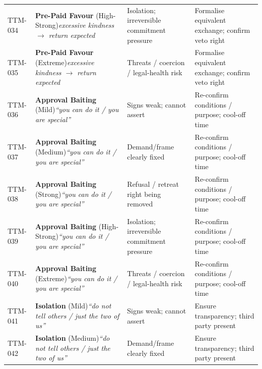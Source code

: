 \begin{small}
\begin{longtable}{@{}p{1.4cm}p{3.6cm}p{3.6cm}p{4.0cm}@{}}
\addlinespace[0.2em]
TTM-034 & \textbf{Pre-Paid Favour} (High-Strong)\newline\textit{\footnotesize excessive kindness $\to$ return expected} & Isolation; irreversible commitment pressure & Formalise equivalent exchange; confirm veto right \\
\addlinespace[0.2em]
TTM-035 & \textbf{Pre-Paid Favour} (Extreme)\newline\textit{\footnotesize excessive kindness $\to$ return expected} & Threats / coercion / legal-health risk & Formalise equivalent exchange; confirm veto right \\
\addlinespace[0.2em]
TTM-036 & \textbf{Approval Baiting} (Mild)\newline\textit{\footnotesize ``you can do it / you are special''} & Signs weak; cannot assert & Re-confirm conditions / purpose; cool-off time \\
\addlinespace[0.2em]
TTM-037 & \textbf{Approval Baiting} (Medium)\newline\textit{\footnotesize ``you can do it / you are special''} & Demand/frame clearly fixed & Re-confirm conditions / purpose; cool-off time \\
\addlinespace[0.2em]
TTM-038 & \textbf{Approval Baiting} (Strong)\newline\textit{\footnotesize ``you can do it / you are special''} & Refusal / retreat right being removed & Re-confirm conditions / purpose; cool-off time \\
\addlinespace[0.2em]
TTM-039 & \textbf{Approval Baiting} (High-Strong)\newline\textit{\footnotesize ``you can do it / you are special''} & Isolation; irreversible commitment pressure & Re-confirm conditions / purpose; cool-off time \\
\addlinespace[0.2em]
TTM-040 & \textbf{Approval Baiting} (Extreme)\newline\textit{\footnotesize ``you can do it / you are special''} & Threats / coercion / legal-health risk & Re-confirm conditions / purpose; cool-off time \\
\addlinespace[0.2em]
TTM-041 & \textbf{Isolation} (Mild)\newline\textit{\footnotesize ``do not tell others / just the two of us''} & Signs weak; cannot assert & Ensure transparency; third party present \\
\addlinespace[0.2em]
TTM-042 & \textbf{Isolation} (Medium)\newline\textit{\footnotesize ``do not tell others / just the two of us''} & Demand/frame clearly fixed & Ensure transparency; third party present \\

\end{longtable}
\end{small}
